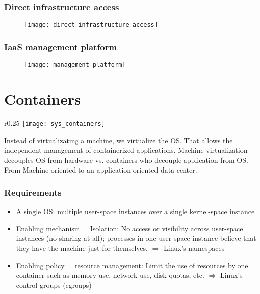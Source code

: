 \subsubsection{Direct infrastructure access}

\begin{figure}[H]
    \centering
    \texttt{[image: direct\_infrastructure\_access]}
\end{figure}

\subsubsection{IaaS management platform}

\begin{figure}[H]
    \centering
    \texttt{[image: management\_platform]}
\end{figure}

\section{Containers}

\begin{wrapfigure}[11]{r}{0.25\textwidth}
    \centering
    \texttt{[image: sys\_containers]}
\end{wrapfigure}

Instead of virtualizating a machine, we virtualize the OS. That allows the independent management of containerized applications. Machine virtualization decouples OS from hardware vs. containers who decouple application from OS. From Machine-oriented to an application oriented data-center.

\subsubsection{Requirements}

\begin{itemize}
    \item A single OS: multiple user-space instances over a single kernel-space instance
    \item Enabling mechanism = Isolation: No access or visibility across user-space instances (no sharing at all); processes in one user-space instance believe that they have the machine just for themselves. $\Rightarrow$ Linux's namespaces
    \item Enabling policy = resource management: Limit the use of resources by one container such as memory use, network use, disk quotas, etc. $\Rightarrow$ Linux's control groups (cgroups)
\end{itemize}

